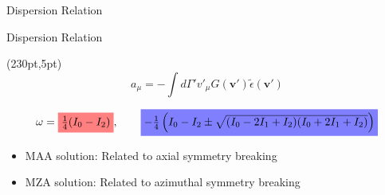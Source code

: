 \documentclass[9pt]{beamer}
\begin{document}
\begin{darkframes}
\begin{frame}{Dispersion Relation}
\end{frame}


\begin{frame}{Dispersion Relation}

   \begin{textblock*}{100pt}(230pt,5pt)
      \begin{equation*}
           a_\mu = -\int d\Gamma' v'_{\mu} G(\boldsymbol{v}') \tilde \epsilon (\boldsymbol{v}')
      \end{equation*}
   \end{textblock*}

   \begin{equation*}
       \omega =
               {\colorbox{red!50}{$\frac{1}{4}(I_0-I_2)$}}
               , \qquad
               \colorbox{blue!50}{$-\frac{1}{4}\left(I_0-I_2\pm \sqrt{ (I_0-2I_1+I_2)(I_0+2I_1+I_2) }\right)$}
   \end{equation*}




   \begin{itemize}
       \item \colorbox{red!50}{MAA solution}: Related to axial symmetry breaking
       \item \colorbox{blue!50}{MZA solution}: Related to azimuthal symmetry breaking
   \end{itemize}















\end{frame}
\end{darkframes}
\end{document}
